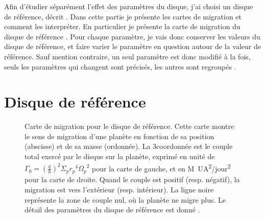 Afin d'étudier séparément l'effet des paramètres du disque, j'ai choisi un disque de référence, décrit
. Dans cette partie je présente les cartes de migration et comment les interpréter. En particulier
je présente la carte de migration du disque de référence . Pour chaque paramètre, je vais
donc conserver les valeurs du disque de référence, et faire varier le paramètre en question autour de la valeur de référence. Sauf
mention contraire, un seul paramètre est donc modifié à la fois, seuls les paramètres qui changent sont précisés, les autres
sont regroupés .

\section{Disque de référence}\label{sec:migrations-maps}\label{sec:reference_disk}

\begin{figure}[htbp]
\centering
{}\hfill
{}

\caption[Carte de migration pour le disque de référence.]{Carte de migration pour le disque de référence. Cette carte montre le
sens de migration d'une planète en fonction de sa
position (abscisse) et de sa masse (ordonnée). La 3\ieme coordonnée est le couple total exercé par le disque sur la planète,
exprimé en unité de $\Gamma_0 = \left(\frac{q}{h}\right)^2\Sigma_p {r_p}^4 {\Omega_p}^2$ pour la carte de gauche, et en \unit{M_\odot UA^2/jour^2} pour la carte de droite. Quand le couple est positif (resp.
négatif), la migration est vers l'extérieur (resp. intérieur). La ligne noire représente la zone de couple nul, où la planète ne
migre plus. Le détail des paramètres du disque de référence est donné .
}\label{fig:fiducial_migration_map}
\end{figure}

